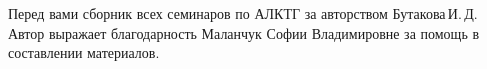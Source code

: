  \label{sec:intro}

Перед вами сборник всех семинаров по АЛКТГ за авторством Бутакова\,И.\,Д.
Автор выражает благодарность Маланчук Софии Владимировне за помощь в составлении материалов.
